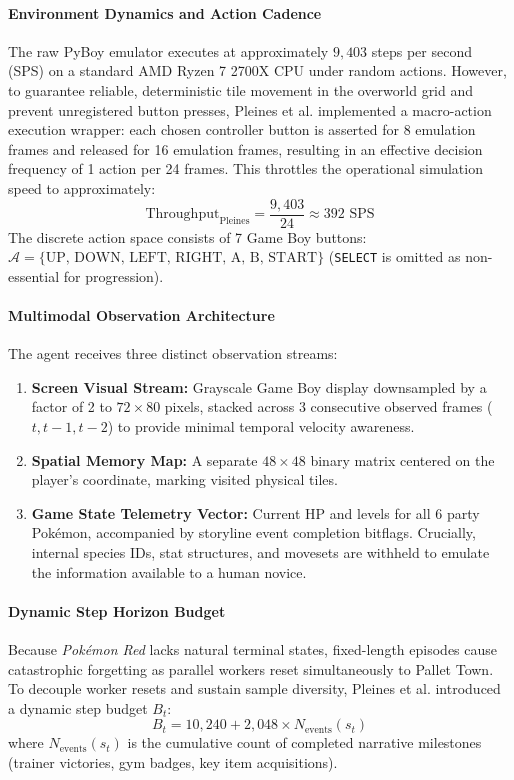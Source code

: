 \documentclass[journal,10pt,twocolumn]{IEEEtran}
\begin{document}
\paragraph{Environment Dynamics and Action Cadence}
The raw PyBoy emulator executes at approximately $9{,}403$ steps per second (SPS) on a standard AMD Ryzen 7 2700X CPU under random actions. However, to guarantee reliable, deterministic tile movement in the overworld grid and prevent unregistered button presses, Pleines et al. implemented a macro-action execution wrapper: each chosen controller button is asserted for 8 emulation frames and released for 16 emulation frames, resulting in an effective decision frequency of 1 action per 24 frames. This throttles the operational simulation speed to approximately:
\begin{equation}
\text{Throughput}_{\text{Pleines}} = \frac{9{,}403}{24} \approx 392 \text{ SPS}
\end{equation}
The discrete action space consists of 7 Game Boy buttons: $\mathcal{A} = \{\text{UP, DOWN, LEFT, RIGHT, A, B, START}\}$ (\texttt{SELECT} is omitted as non-essential for progression).

\paragraph{Multimodal Observation Architecture}
The agent receives three distinct observation streams:
\begin{enumerate}
    \item \textbf{Screen Visual Stream:} Grayscale Game Boy display downsampled by a factor of 2 to $72 \times 80$ pixels, stacked across 3 consecutive observed frames ($t, t-1, t-2$) to provide minimal temporal velocity awareness.
    \item \textbf{Spatial Memory Map:} A separate $48 \times 48$ binary matrix centered on the player's coordinate, marking visited physical tiles.
    \item \textbf{Game State Telemetry Vector:} Current HP and levels for all 6 party Pok{\'e}mon, accompanied by storyline event completion bitflags. Crucially, internal species IDs, stat structures, and movesets are withheld to emulate the information available to a human novice.
\end{enumerate}

\paragraph{Dynamic Step Horizon Budget}
Because \textit{Pok{\'e}mon Red} lacks natural terminal states, fixed-length episodes cause catastrophic forgetting as parallel workers reset simultaneously to Pallet Town. To decouple worker resets and sustain sample diversity, Pleines et al. introduced a dynamic step budget $B_t$:
\begin{equation}
B_t = 10{,}240 + 2{,}048 \times N_{\text{events}}(s_t)
\end{equation}
where $N_{\text{events}}(s_t)$ is the cumulative count of completed narrative milestones (trainer victories, gym badges, key item acquisitions).
\end{document}
